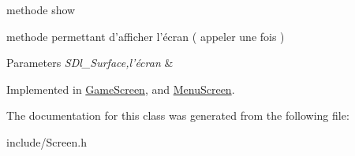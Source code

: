 methode show 

methode permettant d'afficher l'écran ( appeler une fois )


\begin{DoxyParams}{Parameters}
{\em S\-Dl\-\_\-\-Surface,l'écran} & \\
\hline
\end{DoxyParams}


Implemented in \hyperlink{classGameScreen_a43a2a1a9c28f8e2892ae3d91e1dcfa1f}{Game\-Screen}, and \hyperlink{classMenuScreen_a6ff381327f56f7e40ae481f28b241bd2}{Menu\-Screen}.



The documentation for this class was generated from the following file\-:\begin{DoxyCompactItemize}
\item 
include/Screen.\-h\end{DoxyCompactItemize}
